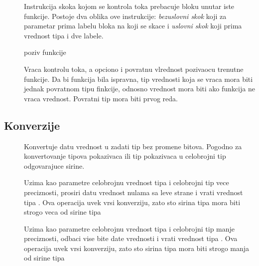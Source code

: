\begin{description}
\item[] Instrukcija skoka kojom se kontrola toka prebacuje bloku unutar iste funkcije. Postoje dva oblika ove instrukcije: \textit{bezuslovni skok} koji za parametar prima labelu bloka na koji se skace i \textit{uslovni skok} koji prima vrednost tipa  i dve labele.
\item[] poziv funkcije
\item[] Vraca kontrolu toka, a opciono i povratnu vlrednost pozivaocu trenutne funkcije. Da bi funkcija bila ispravna, tip vrednosti koja se vraca mora biti jednak povratnom tipu finkcije, odnosno vrednost mora biti  ako funkcija ne vraca vrednost. Povratni tip mora biti prvog reda.
\end{description}

\subsection*{Konverzije}

\begin{description}
\item[] Konvertuje datu vrednost u zadati tip bez promene bitova. Pogodno za konvertovanje tipova pokazivaca ili tip pokazivaca u celobrojni tip odgovarajuce sirine.
\item[]
\item[] Uzima kao parametre celobrojnu vrednost tipa  i celobrojni tip  vece preciznosti, prosiri datu vrednost nulama sa leve strane i vrati vrednost tipa . Ova operacija uvek vrsi konverziju, zato sto sirina tipa  mora biti strogo veca od sirine tipa 
\item[] Uzima kao parametre celobrojnu vrednost tipa  i celobrojni tip  manje preciznosti, odbaci vise bite date vrednosti i vrati vrednost tipa . Ova operacija uvek vrsi konverziju, zato sto sirina tipa  mora biti strogo manja od sirine tipa 
\end{description}
